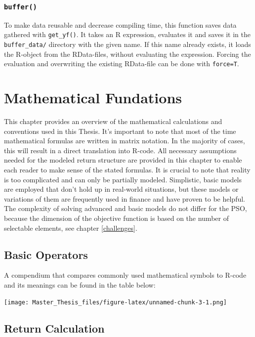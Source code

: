 \documentclass[
  oneside]{book}
\begin{document}
\hypertarget{buffer}{%
\subsection{\texorpdfstring{\texttt{buffer()}}{buffer()}}\label{buffer}}

To make data reusable and decrease compiling time, this function saves data gathered with \texttt{get\_yf()}. It takes an R expression, evaluates it and saves it in the \texttt{buffer\_data/} directory with the given name. If this name already exists, it loads the R-object from the RData-files, without evaluating the expression. Forcing the evaluation and overwriting the existing RData-file can be done with \texttt{force=T}.

\hypertarget{mathfundations}{%
\chapter{Mathematical Fundations}\label{mathfundations}}

This chapter provides an overview of the mathematical calculations and conventions used in this Thesis. It's important to note that most of the time mathematical formulas are written in matrix notation. In the majority of cases, this will result in a direct translation into R-code. All necessary assumptions needed for the modeled return structure are provided in this chapter to enable each reader to make sense of the stated formulas. It is crucial to note that reality is too complicated and can only be partially modeled. Simplistic, basic models are employed that don't hold up in real-world situations, but these models or variations of them are frequently used in finance and have proven to be helpful. The complexity of solving advanced and basic models do not differ for the PSO, because the dimension of the objective function is based on the number of selectable elements, see chapter \ref{challenges}.

\hypertarget{basic-operators}{%
\section{Basic Operators}\label{basic-operators}}

A compendium that compares commonly used mathematical symbols to R-code and its meanings can be found in the table below:

\texttt{[image: Master\_Thesis\_files/figure-latex/unnamed-chunk-3-1.png]}

\hypertarget{return-calculation}{%
\section{Return Calculation}\label{return-calculation}}
\end{document}
